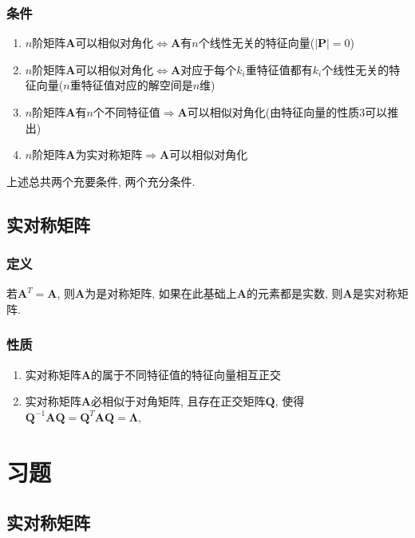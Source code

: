 \documentclass[oneside, onecolumn]{ctexbook}
\begin{document}
\subsubsection{条件}
\begin{enumerate}
	\item $ n $阶矩阵$ \bm{A} $可以相似对角化$ \Leftrightarrow $$ \bm{A} $有$ n $个线性无关的特征向量($ \left| \bm{P}\right| = 0$)
	\item $ n $阶矩阵$ \bm{A} $可以相似对角化$ \Leftrightarrow $$ \bm{A} $对应于每个$ k_i $重特征值都有$ k_i $个线性无关的特征向量($ n $重特征值对应的解空间是$ n $维)
	\item $ n $阶矩阵$ \bm{A} $有$ n $个不同特征值$ \Rightarrow $$ \bm{A} $可以相似对角化(由特征向量的性质3可以推出)
	\item $ n $阶矩阵$ \bm{A} $为实对称矩阵$ \Rightarrow $$ \bm{A} $可以相似对角化
\end{enumerate}\par
上述总共两个充要条件, 两个充分条件.
\subsection{实对称矩阵}
\subsubsection{定义}
若$ \bm{A}^T = \bm{A} $, 则$ \bm{A} $为是对称矩阵, 如果在此基础上$ \bm{A} $的元素都是实数, 则$ \bm{A} $是实对称矩阵.
\subsubsection{性质}
\begin{enumerate}
	\item 实对称矩阵$ \bm{A} $的属于不同特征值的特征向量相互正交
	\item 实对称矩阵$ \bm{A} $必相似于对角矩阵, 且存在正交矩阵$ \bm{Q} $, 使得$ \bm{Q}^{-1}\bm{A}\bm{Q}=\bm{Q}^{T}\bm{A}\bm{Q}=\bm{\Lambda}$,  
\end{enumerate}
\section{习题}
\subsection{实对称矩阵}
\end{document}
